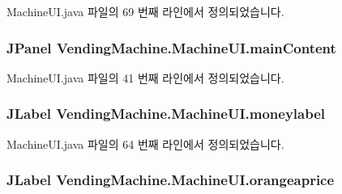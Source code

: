 Machine\+U\+I.\+java 파일의 69 번째 라인에서 정의되었습니다.

\subsubsection[{\texorpdfstring{main\+Content}{mainContent}}]{\setlength{\rightskip}{0pt plus 5cm}J\+Panel Vending\+Machine.\+Machine\+U\+I.\+main\+Content\hspace{0.3cm}{\ttfamily [private]}}\hypertarget{class_vending_machine_1_1_machine_u_i_a2a9d8b6482b348ca6efb5ff6973e3a3b}{}\label{class_vending_machine_1_1_machine_u_i_a2a9d8b6482b348ca6efb5ff6973e3a3b}


Machine\+U\+I.\+java 파일의 41 번째 라인에서 정의되었습니다.

\subsubsection[{\texorpdfstring{moneylabel}{moneylabel}}]{\setlength{\rightskip}{0pt plus 5cm}J\+Label Vending\+Machine.\+Machine\+U\+I.\+moneylabel\hspace{0.3cm}{\ttfamily [private]}}\hypertarget{class_vending_machine_1_1_machine_u_i_a9da605a2313ee30b2219bce28977b9fe}{}\label{class_vending_machine_1_1_machine_u_i_a9da605a2313ee30b2219bce28977b9fe}


Machine\+U\+I.\+java 파일의 64 번째 라인에서 정의되었습니다.

\subsubsection[{\texorpdfstring{orangeaprice}{orangeaprice}}]{\setlength{\rightskip}{0pt plus 5cm}J\+Label Vending\+Machine.\+Machine\+U\+I.\+orangeaprice\hspace{0.3cm}{\ttfamily [private]}}\hypertarget{class_vending_machine_1_1_machine_u_i_ac8f6bb93109b80f848429fc8d72d167b}{}\label{class_vending_machine_1_1_machine_u_i_ac8f6bb93109b80f848429fc8d72d167b}


